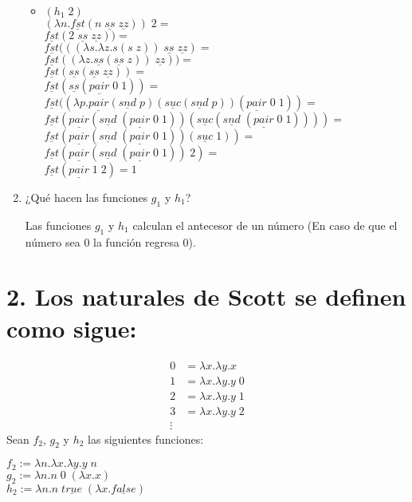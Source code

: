 \documentclass[11pt, a4paper]{report}
\begin{document}
\begin{enumerate}[label=\alph*)]
\begin{itemize}
   	\item $(h_{1}\; 2)$ \\
    $(\lambda n. \underline{fst} (n\;\underline{ss}\;\underline{zz}))\;2=$\\
    $\underline{fst} (2\;\underline{ss}\;\underline{zz}))=$\\
    $\underline{fst} (((\lambda s.\lambda z. 
    s(s\;z))\;\underline{ss}\;\underline{zz})=$\\
    $\underline{fst} ((\lambda z. \underline{ss}(\underline{ss}\;z))
    \;\underline{zz}))=$\\
    $\underline{fst} (\underline{ss}(\underline{ss}\;\underline{zz}))=$\\
    $\underline{fst} (\underline{ss}(\underline{pair}\;0\;1))=$\\
    $\underline{fst} ((\lambda p.\underline{pair} (\underline{snd}\;p) (\underline{suc} 
    (\underline{snd}\;p))(\underline{pair}\;0\;1))=$\\
    $\underline{fst} (\underline{pair} (\underline{snd}\;				
    (\underline{pair}\;0\;1)) (\underline{suc} 
    (\underline{snd}\;(\underline{pair}\;0\;1))))=$\\
    $\underline{fst} (\underline{pair} (\underline{snd}\;				
    (\underline{pair}\;0\;1)) (\underline{suc}\;1))=$\\
    $\underline{fst} (\underline{pair} (\underline{snd}\;				
    (\underline{pair}\;0\;1))\;2)=$\\
    $\underline{fst} (\underline{pair}\;1\;2)= 1$\\
    
	\end{itemize}
\item ¿Qué hacen las funciones $g_{1}$ y $h_{1}$?
	
  Las funciones $g_{1}$ y $h_{1}$ calculan el antecesor de un número (En caso de que el n\'umero sea 0
  la funci\'on regresa 0).

\end{enumerate}

\section*{2. Los naturales de Scott se definen como sigue:}
 \begin{align*}
	0 &= \lambda x.\lambda y. x \\
	1 &= \lambda x.\lambda y. y\;0 \\
	2 &= \lambda x.\lambda y. y\;1 \\
    3 &= \lambda x.\lambda y. y\;2 \\
	\vdots 
  \end{align*}
  Sean $f_{2}$, $g_{2}$ y $h_{2}$ las siguientes funciones:
   \begin{center}
	$f_{2}:= \lambda n. \lambda x. \lambda y. y\; n$\\
	$g_{2}:= \lambda n. n\; 0\; (\lambda x. x)$\\
	$h_{2}:= \lambda n. n \; \underline{true} \; (\lambda x. \underline{false})$\\
  \end{center}
  
\end{document}
